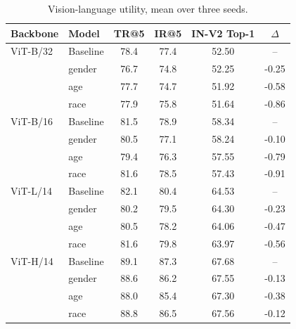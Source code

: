 \begin{table}[t]\centering\small
\caption{Vision-language utility, mean over three seeds.}
\begin{tabular}{llcccc}\toprule
Backbone & Model & TR@5 & IR@5 & IN-V2 Top-1 & $\Delta$\\\midrule
ViT-B/32 & Baseline & 78.4 & 77.4 & 52.50 & --\\
 & gender & 76.7 & 74.8 & 52.25 & -0.25\\
 & age & 77.7 & 74.7 & 51.92 & -0.58\\
 & race & 77.9 & 75.8 & 51.64 & -0.86\\
ViT-B/16 & Baseline & 81.5 & 78.9 & 58.34 & --\\
 & gender & 80.5 & 77.1 & 58.24 & -0.10\\
 & age & 79.4 & 76.3 & 57.55 & -0.79\\
 & race & 81.6 & 78.5 & 57.43 & -0.91\\
ViT-L/14 & Baseline & 82.1 & 80.4 & 64.53 & --\\
 & gender & 80.2 & 79.5 & 64.30 & -0.23\\
 & age & 80.5 & 78.2 & 64.06 & -0.47\\
 & race & 81.6 & 79.8 & 63.97 & -0.56\\
ViT-H/14 & Baseline & 89.1 & 87.3 & 67.68 & --\\
 & gender & 88.6 & 86.2 & 67.55 & -0.13\\
 & age & 88.0 & 85.4 & 67.30 & -0.38\\
 & race & 88.8 & 86.5 & 67.56 & -0.12\\
\bottomrule\end{tabular}\end{table}